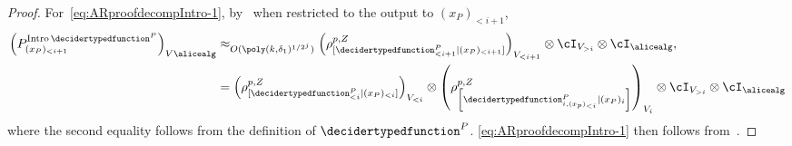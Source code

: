 \begin{proof}
	 For~\eqref{eq:ARproofdecompIntro-1}, by~ when restricted to the output to $(x_P)_{< i+1}$, 
	 \begin{align*}
	 		\left(P^{\text{Intro} \, \decidertypedfunction^P}_{(x_P)_{< i+1}} \right)_{V \alicealg}	&\approx_{O(\poly(k, \delta_1)^{1/2^j})} \left(\rho^{p,Z}_{[\decidertypedfunction^P_{< i+1}|(x_P)_{< i+1} ]}\right)_{V_{< i+1}}\otimes \cI_{V_{> i}} \otimes \cI_\alicealg,  \\
	 		&=\left(\rho^{p,Z}_{[\decidertypedfunction^P_{< i}|(x_P)_{< i} ]}\right)_{V_{< i}} \otimes \left(\rho_{\left[\decidertypedfunction_{i, (x_p)_{< i}}^{P} | (x_P)_i \right]}^{p, Z}\right)_{V_i} \otimes \cI_{V_{> i}} \otimes \cI_\alicealg
	 \end{align*}
 	where the second equality follows from the definition of $\decidertypedfunction^P$. \eqref{eq:ARproofdecompIntro-1} then follows from~. 
 	

\end{proof}
